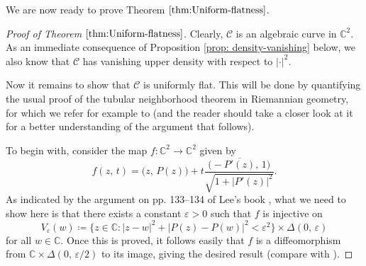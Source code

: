 \documentclass[12pt,a4paper]{amsart}
\numberwithin{equation}{section}
\theoremstyle{definition}
\begin{document}
We are now ready to prove Theorem $\ref{thm:Uniform-flatness}$.

\begin{proof}[Proof of Theorem $\ref{thm:Uniform-flatness}$]
Clearly, $\mathcal{C}$ is an algebraic curve in $\mathbb C^2$. As an immediate consequence of Proposition \ref{prop: density-vanishing} below, we also know that $\mathcal{C}$ has vanishing upper density with respect to $|\cdot|^2$.

Now it remains to show that $\mathcal{C}$ is uniformly flat. This will be done by quantifying the usual proof of the tubular neighborhood theorem in Riemannian geometry, for which we refer for example to \cite[pp. 133--135]{Lee_RGbook} (and the reader should take a closer look at it for a better understanding of the argument that follows).

 To begin with, consider the map $f\!:\mathbb C^2\to \mathbb C^2$ given by
   $$
   f(z,\, t)=\big(z,\, P(z)\big)+t\frac{\big(-\overline{P'(z)},\, 1\big)}{\displaystyle\sqrt{1+|P'(z)|^2}}.
   $$
As indicated by the argument on pp. 133--134 of Lee's book \cite{Lee_RGbook}, what we need to show here is that there exists a constant $\varepsilon>0$ such that $f$ is injective on
  \begin{equation*}\label{defn: tub-nbhd}
    V_{\varepsilon}(w)\coloneqq \Big\{z\in \mathbb C\!: |z-w|^2+|P(z)-P(w)|^2<\varepsilon^2\Big\}\times\Delta(0,\, \varepsilon)
  \end{equation*}
for all $w\in\mathbb C$. Once this is proved, it follows easily that $f$ is a diffeomorphism from $\mathbb C\times\Delta(0,\,\varepsilon/2)$ to its image, giving the desired result (compare with \cite[p. 135]{Lee_RGbook}).



\end{proof}
\end{document}
